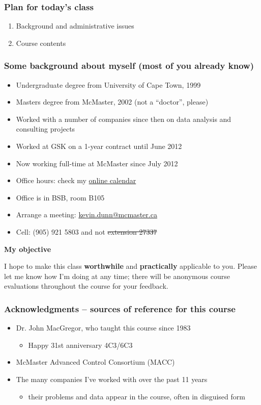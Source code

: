 \begin{frame}\frametitle{Plan for today's class}
	\begin{enumerate}
		\item	Background and administrative issues
		\item	Course contents
	\end{enumerate}
\end{frame}

\begin{frame}\frametitle{Some background about myself (most of you already know)}
	\begin{itemize}
		\item	Undergraduate degree from University of Cape Town, 1999
		\item	Masters degree from McMaster, 2002 (not a ``doctor'', please)
		\item	Worked with a number of companies since then on data analysis and consulting projects
		\item	Worked at GSK on a 1-year contract until June 2012
		\item	Now working full-time at McMaster since July 2012
		\item	Office hours: check my \href{http://learnche.mcmaster.ca/contact-info}{online calendar}
		\item	Office is in BSB, room B105
		\item	Arrange a meeting: \url{kevin.dunn@mcmaster.ca}
		\item	Cell: (905) 921 5803 and not \sout{extension 27337}
	\end{itemize}

	\vspace{12pt}
	\textbf{My objective}

	\vspace{6pt}
	I hope to make this class \textbf{worthwhile} and \textbf{practically} applicable to you. Please let me know how I'm doing at any time; there will be anonymous course evaluations throughout the course for your feedback.
\end{frame}

\begin{frame}\frametitle{Acknowledgments -- sources of reference for this course}
	\begin{itemize}
		\item	Dr. John MacGregor, who taught this course since 1983
		\begin{itemize}
			\item	Happy 31st anniversary 4C3/6C3
		\end{itemize}
		\item	McMaster Advanced Control Consortium (MACC)
		\item	The many companies I've worked with over the past 11 years
			\begin{itemize}
				\item	their problems and data appear in the course, often in disguised form
			\end{itemize}
	\end{itemize}
\end{frame}

